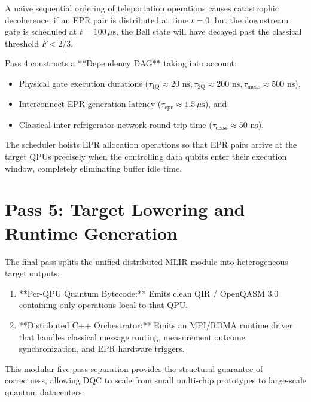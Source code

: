 A naive sequential ordering of teleportation operations causes catastrophic decoherence: if an EPR pair is distributed at time $t=0$, but the downstream gate is scheduled at $t = 100\,\mu\text{s}$, the Bell state will have decayed past the classical threshold $F < 2/3$.

Pass 4 constructs a **Dependency DAG** taking into account:
\begin{itemize}
    \item Physical gate execution durations ($\tau_{\text{1Q}} \approx 20\text{ ns}, \tau_{\text{2Q}} \approx 200\text{ ns}, \tau_{\text{meas}} \approx 500\text{ ns}$),
    \item Interconnect EPR generation latency ($\tau_{\text{epr}} \approx 1.5\,\mu\text{s}$), and
    \item Classical inter-refrigerator network round-trip time ($\tau_{\text{class}} \approx 50\text{ ns}$).
\end{itemize}

The scheduler hoists EPR allocation operations so that EPR pairs arrive at the target QPUs precisely when the controlling data qubits enter their execution window, completely eliminating buffer idle time.

\section{Pass 5: Target Lowering and Runtime Generation}
\label{sec:pass5_lowering}

The final pass splits the unified distributed MLIR module into heterogeneous target outputs:
\begin{enumerate}
    \item **Per-QPU Quantum Bytecode:** Emits clean QIR / OpenQASM 3.0 containing only operations local to that QPU.
    \item **Distributed C++ Orchestrator:** Emits an MPI/RDMA runtime driver that handles classical message routing, measurement outcome synchronization, and EPR hardware triggers.
\end{enumerate}

This modular five-pass separation provides the structural guarantee of correctness, allowing DQC to scale from small multi-chip prototypes to large-scale quantum datacenters.
